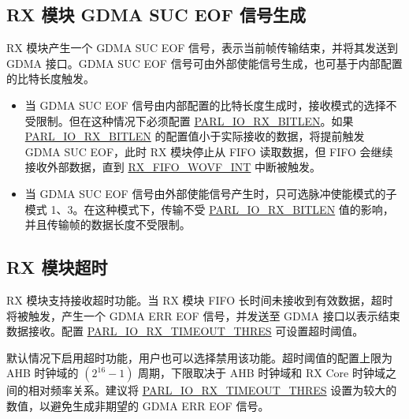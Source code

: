 \documentclass[main\_\_CN.tex]{subfiles}
\begin{document}
\subsection{RX 模块 GDMA SUC EOF 信号生成}

RX 模块产生一个 GDMA SUC EOF 信号，表示当前帧传输结束，并将其发送到 GDMA 接口。GDMA SUC EOF 信号可由外部使能信号生成，也可基于内部配置的比特长度触发。

\begin{itemize}
    \item 当 GDMA SUC EOF 信号由内部配置的比特长度生成时，接收模式的选择不受限制。但在这种情况下必须配置 \hyperref[fielddesc:PARLIORXBITLEN]{PARL\_IO\_RX\_BITLEN}。如果 \hyperref[fielddesc:PARLIORXBITLEN]{PARL\_IO\_RX\_BITLEN} 的配置值小于实际接收的数据，将提前触发 GDMA SUC EOF，此时 RX 模块停止从 FIFO 读取数据，但 FIFO 会继续接收外部数据，直到 \hyperref[int:RXFIFOWOVFINT]{RX\_FIFO\_WOVF\_INT} 中断被触发。
    \item 当 GDMA SUC EOF 信号由外部使能信号产生时，只可选脉冲使能模式的子模式 1、3。在这种模式下，传输不受 \hyperref[fielddesc:PARLIORXBITLEN]{PARL\_IO\_RX\_BITLEN} 值的影响，并且传输帧的数据长度不受限制。
\end{itemize}

\subsection{RX 模块超时}

RX 模块支持接收超时功能。当 RX 模块 FIFO 长时间未接收到有效数据，超时将被触发，产生一个 GDMA ERR EOF 信号，并发送至 GDMA 接口以表示结束数据接收。配置 \hyperref[fielddesc:PARLIORXTIMEOUTTHRES]{PARL\_IO\_RX\_TIMEOUT\_THRES} 可设置超时阈值。

默认情况下启用超时功能，用户也可以选择禁用该功能。超时阈值的配置上限为 AHB 时钟域的 \begin{math} (2^{16}-1) \end{math} 周期，下限取决于 AHB 时钟域和 RX Core 时钟域之间的相对频率关系。建议将 \hyperref[fielddesc:PARLIORXTIMEOUTTHRES]{PARL\_IO\_RX\_TIMEOUT\_THRES} 设置为较大的数值，以避免生成非期望的 GDMA ERR EOF 信号。
\end{document}
